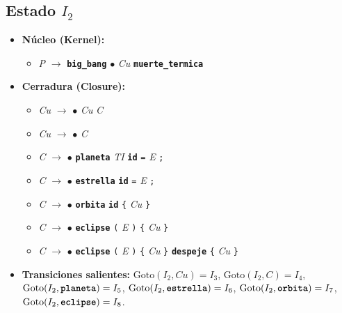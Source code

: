 \documentclass[12pt, letterpaper]{article}
\begin{document}
\subsection*{Estado $I_{2}$ }
\begin{itemize}\setlength{\itemsep}{1pt}\setlength{\parskip}{0pt}
\item \textbf{Núcleo (Kernel):}
\begin{itemize}\setlength{\itemsep}{1pt}\setlength{\parskip}{0pt}
    \item \textit{P} $\to$ \textbf{\texttt{big\_bang}} $\bullet$ \textit{Cu} \textbf{\texttt{muerte\_termica}}
\end{itemize}
\item \textbf{Cerradura (Closure):}
\begin{itemize}\setlength{\itemsep}{1pt}\setlength{\parskip}{0pt}
    \item \textit{Cu} $\to$ $\bullet$ \textit{Cu} \textit{C}
    \item \textit{Cu} $\to$ $\bullet$ \textit{C}
    \item \textit{C} $\to$ $\bullet$ \textbf{\texttt{planeta}} \textit{TI} \textbf{\texttt{id}} \texttt{=} \textit{E} \texttt{;}
    \item \textit{C} $\to$ $\bullet$ \textbf{\texttt{estrella}} \textbf{\texttt{id}} \texttt{=} \textit{E} \texttt{;}
    \item \textit{C} $\to$ $\bullet$ \textbf{\texttt{orbita}} \textbf{\texttt{id}} \texttt{\{} \textit{Cu} \texttt{\}}
    \item \textit{C} $\to$ $\bullet$ \textbf{\texttt{eclipse}} \texttt{(} \textit{E} \texttt{)} \texttt{\{} \textit{Cu} \texttt{\}}
    \item \textit{C} $\to$ $\bullet$ \textbf{\texttt{eclipse}} \texttt{(} \textit{E} \texttt{)} \texttt{\{} \textit{Cu} \texttt{\}} \textbf{\texttt{despeje}} \texttt{\{} \textit{Cu} \texttt{\}}
\end{itemize}
\item \textbf{Transiciones salientes:} $\text{Goto}(I_{2}, \textit{Cu}) = I_{3}$, \quad $\text{Goto}(I_{2}, \textit{C}) = I_{4}$, \quad $\text{Goto}(I_{2}, \textbf{\texttt{planeta}}) = I_{5}$, \quad $\text{Goto}(I_{2}, \textbf{\texttt{estrella}}) = I_{6}$, \quad $\text{Goto}(I_{2}, \textbf{\texttt{orbita}}) = I_{7}$, \quad $\text{Goto}(I_{2}, \textbf{\texttt{eclipse}}) = I_{8}$.
\end{itemize}
\vspace{2pt}
\end{document}
